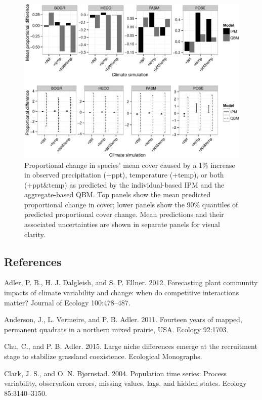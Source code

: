 \documentclass[12pt,]{article}
\begin{document}
\begin{figure}[htbp]
\centering
\includegraphics{components/figure/manuscript-figure_3.pdf}
\caption{Proportional change in species' mean cover caused by a 1\%
increase in observed precipitation (+ppt), temperature (+temp), or both
(+ppt\&temp) as predicted by the individual-based IPM and the
aggregate-based QBM. Top panels show the mean predicted proportional
change in cover; lower panels show the 90\% quantiles of predicted
proportional cover change. Mean predictions and their associated
uncertainties are shown in separate panels for visual clarity.}
\end{figure}

\pagebreak{}

\subsection*{References}\label{references}

Adler, P. B., H. J. Dalgleish, and S. P. Ellner. 2012. Forecasting plant
community impacts of climate variability and change: when do competitive
interactions matter? Journal of Ecology 100:478--487.

Anderson, J., L. Vermeire, and P. B. Adler. 2011. Fourteen years of
mapped, permanent quadrats in a northern mixed prairie, USA. Ecology
92:1703.

Chu, C., and P. B. Adler. 2015. Large niche differences emerge at the
recruitment stage to stabilize grassland coexistence. Ecological
Monographs.

Clark, J. S., and O. N. Bjørnstad. 2004. Population time series: Process
variability, observation errors, missing values, lags, and hidden
states. Ecology 85:3140--3150.
\end{document}
